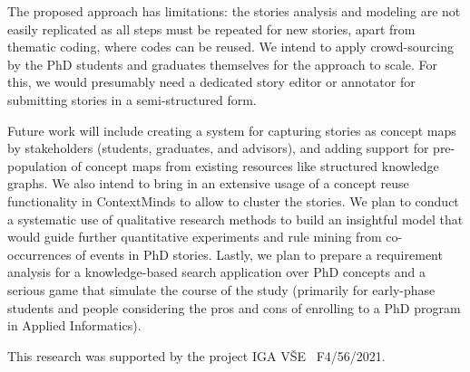 \documentclass[sigconf]{acmart}
\begin{document}
The proposed approach has limitations: the stories analysis and modeling are not easily replicated as all steps must be repeated for new stories, apart from thematic coding, where codes can be reused. We intend to apply crowd-sourcing by the PhD students and graduates themselves for the approach to scale. For this, we would presumably need a dedicated story editor or annotator for submitting stories in a semi-structured form. 

Future work will include creating a system for capturing stories as concept maps by stakeholders (students, graduates, and advisors), and adding support for pre-population of concept maps from existing resources like structured knowledge graphs. %
We also intend to bring in an extensive usage of a concept reuse functionality in ContextMinds to allow to cluster the stories. We plan to conduct a systematic use of qualitative research methods to build an insightful model that would guide further quantitative experiments and rule mining from co-occurrences of events in PhD stories. Lastly, we plan to prepare a requirement analysis for a knowledge-based search application over PhD concepts and a serious game that simulate the course of the study (primarily for early-phase students and people considering the pros and cons of enrolling to a PhD program in Applied Informatics).
\begin{acks}
This research was supported by the project IGA V\v{S}E \textnumero\ F4/56/2021.
\end{acks}



\end{document}
